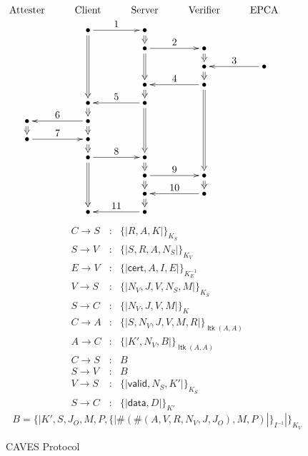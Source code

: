 \documentclass[titlepage,12pt]{article}
\theoremstyle{definition}
\newcommand{\enc}[2]{\{\!|#1|\!\}_{#2}}
\newcommand{\hash}[1]{\#(#1)}
\newcommand{\cert}{\mathsf{cert}}
\newcommand{\valid}{\mathsf{valid}}
\newcommand{\data}{\mathsf{data}}
\DeclareMathOperator{\ltk}{\mathsf{ltk}}
\begin{document}
\newcommand{\ctosa}{\enc{R,A,K}{K_S}}
\newcommand{\stova}{\enc{S,R,A,N_S}{K_V}}
\newcommand{\ptova}{\enc{\cert,A, I, E}{K^{-1}_E}}
\newcommand{\vtosa}{\enc{N_V,J,V,N_S,M}{K_S}}
\newcommand{\stoca}{\enc{N_V,J,V,M}{K}}
\newcommand{\ctoaa}{\enc{S, N_V,J,V,M,R}{\ltk(A,A)}}
\newcommand{\blob}{\enc{K',S,J_O,M,P,
\enc{\hash{\hash{A,V,R,N_V,J,J_O},M,P}}{I^{-1}}}{K_V}}
\newcommand{\atoca}{\enc{K',N_V,B}{\ltk(A,A)}}
\newcommand{\vtosb}{\enc{\valid,N_S,K'}{K_S}}
\newcommand{\stocb}{\enc{\data,D}{K'}}
\begin{figure}
$$\xymatrix@R=1.8ex{
\txt{\strut Attester}&\txt{\strut Client}&\txt{\strut Server}&\txt{\strut Verifier}&\txt{\strut EPCA}\\
&\bullet\ar@{=>}[dddd]\ar[r]^{\textstyle 1}&\bullet\ar@{=>}[d]&&\\
&&\bullet\ar@{=>}[dd]\ar[r]^{\textstyle 2}&\bullet\ar@{=>}[d]&\\
&&&\bullet\ar@{=>}[d]&\bullet\ar[l]_{\textstyle 3}\\
&&\bullet\ar@{=>}[d]&\bullet\ar@{=>}[ddddd]\ar[l]_{\textstyle 4}&\\
&\bullet\ar@{=>}[d]&\bullet\ar@{=>}[ddd]\ar[l]_{\textstyle 5}&&&\\
\bullet\ar@{=>}[d]&\bullet\ar@{=>}[d]\ar[l]_{\textstyle 6}&&&\\
\bullet\ar[r]^{\textstyle 7}&\bullet\ar@{=>}[d]&&&\\
&\bullet\ar@{=>}[ddd]\ar[r]^{\textstyle 8}&\bullet\ar@{=>}[d]&&\\
&&\bullet\ar@{=>}[d]\ar[r]^{\textstyle 9}&\bullet\ar@{=>}[d]&\\
&&\bullet\ar@{=>}[d]&\bullet\ar[l]_{\textstyle 10}&\\
&\bullet&\bullet\ar[l]_{\textstyle 11}&&}$$
\begin{eqnarray}
C\to S&:&\ctosa\\
S\to V&:&\stova\\
E\to V&:&\ptova\\
V\to S&:&\vtosa\\
S\to C&:&\stoca\\
C\to A&:&\ctoaa\label{eq:attester request}\\
A\to C&:&\atoca\label{eq:attester response}\\
C\to S&:&B\\
S\to V&:&B\\
V\to S&:&\vtosb\\
S\to C&:&\stocb
\end{eqnarray}
$$B=\blob$$
\caption{CAVES Protocol}\label{fig:caves}
\end{figure}
\end{document}
